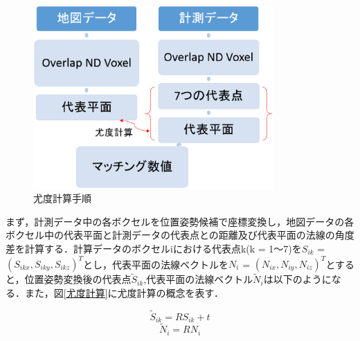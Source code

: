 \vspace{10mm}
\begin{figure}[htbp]
  \begin{center}
   \includegraphics[height=70mm]{figure/尤度計算手順.eps}
   \caption{尤度計算手順}
   \label{尤度計算手順}
  \end{center}
\end{figure}
%
まず，計測データ中の各ボクセルを位置姿勢候補で座標変換し，地図データの各ボクセル中の代表平面と計測データの代表点との距離及び代表平面の法線の角度差を計算する．計算データのボクセルiにおける代表点k(k = 1～7)を$S_{ik}$ = $(S_{ikx},S_{iky},S_{ikz})^T$とし，代表平面の法線ベクトルを$N_{i}$ = $(N_{ix},N_{iy},N_{iz})^T$とすると，位置姿勢変換後の代表点$\tilde{S}_{ik}$,代表平面の法線ベクトル$\tilde{N}_{i}$は以下のようになる．また，図{\ref{尤度計算}}に尤度計算の概念を表す．

\begin{equation}
\tilde{S}_{ik} = RS_{ik} + t
\end{equation}
\begin{equation}
\tilde{N}_{i} = RN_{i}
\end{equation}

